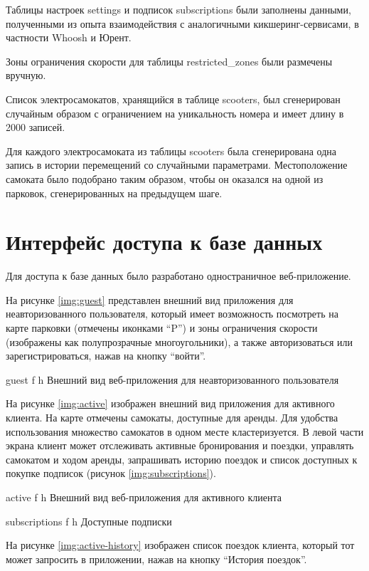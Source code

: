 Таблицы настроек settings и подписок subscriptions были заполнены данными, полученными из опыта взаимодействия с аналогичными кикшеринг-сервисами, в частности Whoosh и Юрент.

Зоны ограничения скорости для таблицы restricted\_zones были размечены вручную.

Список электросамокатов, хранящийся в таблице scooters, был сгенерирован случайным образом с ограничением на уникальность номера и имеет длину в 2000 записей.

Для каждого электросамоката из таблицы scooters была сгенерирована одна запись в истории перемещений со случайными параметрами. Местоположение самоката было подобрано таким образом, чтобы он оказался на одной из парковок, сгенерированных на предыдущем шаге.

\section{Интерфейс доступа к базе данных}

Для доступа к базе данных было разработано одностраничное веб-приложение.

На рисунке \ref{img:guest} представлен внешний вид приложения для неавторизованного пользователя, который имеет возможность посмотреть на карте парковки (отмечены иконками \enquote{P}) и зоны ограничения скорости (изображены как полупрозрачные многоугольники), а также авторизоваться или зарегистрироваться, нажав на кнопку \enquote{войти}.

{guest}
{f}
{h}
{\textwidth}
{Внешний вид веб-приложения для неавторизованного пользователя}

На рисунке \ref{img:active} изображен внешний вид приложения для активного клиента. На карте отмечены самокаты, доступные для аренды. Для удобства использования множество самокатов в одном месте кластеризуется. В левой части экрана клиент может отслеживать активные бронирования и поездки, управлять самокатом и ходом аренды, запрашивать историю поездок и список доступных к покупке подписок (рисунок \ref{img:subscriptions}).

{active}
{f}
{h}
{\textwidth}
{Внешний вид веб-приложения для активного клиента}

{subscriptions}
{f}
{h}
{\textwidth}
{Доступные подписки}

На рисунке \ref{img:active-history} изображен список поездок клиента, который тот может запросить в приложении, нажав на кнопку \enquote{История поездок}.

